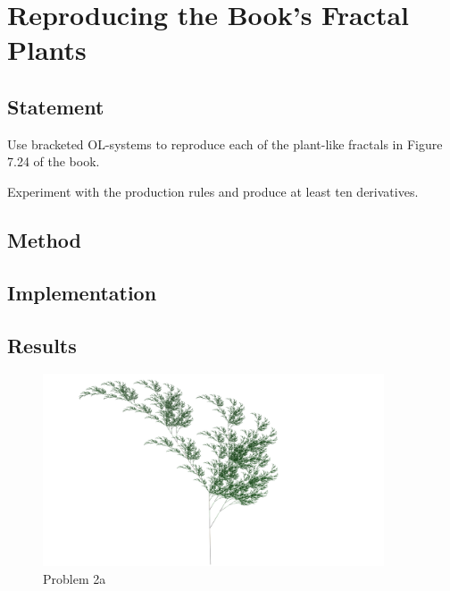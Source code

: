 \section{Reproducing the Book's Fractal Plants}

\subsection{Statement}
Use bracketed OL-systems to reproduce each of the plant-like fractals in Figure 7.24 of the book.

Experiment with the production rules and produce at least ten derivatives.

\subsection{Method}

\subsection{Implementation}

\subsection{Results}


\begin{figure}[H]
\centering
\noindent\includegraphics[width=0.90\textwidth]{figures/L-systems/a}
\caption{Problem 2a}
\label{fig:prob2a}
\end{figure}

